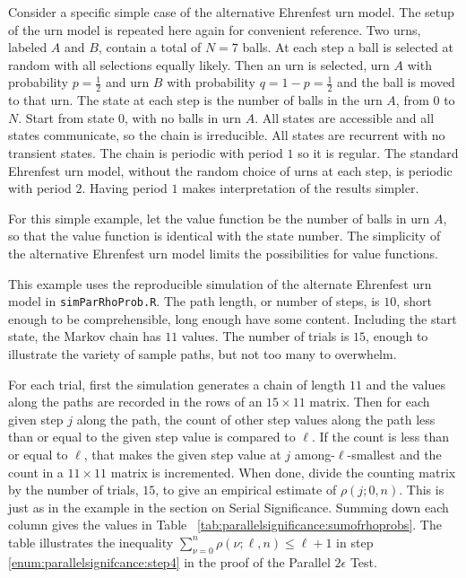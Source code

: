 \documentclass[12pt]{article}
\begin{document}
\begin{example}
    Consider a specific simple case of the alternative Ehrenfest urn
    model.%
    The setup of the urn model is repeated here again for convenient
    reference. Two urns, labeled \( A \) and \( B \), contain a total of
    \( N = 7 \) balls.  At each step a ball is selected at random with
    all selections equally likely.  Then an urn is selected, urn \( A \)
    with probability \( p = \frac{1}{2} \) and urn \( B \) with
    probability \( q = 1-p = \frac {1}{2} \) and the ball is moved to
    that urn.  The state at each step is the number of balls in the urn \(
    A \), from \( 0 \) to \( N \).  Start from state \( 0 \), with no
    balls in urn \( A \).  All states are accessible and all states
    communicate, so the chain is irreducible.  All states are recurrent
    with no transient states.  The chain is periodic with period \( 1 \)
    so it is regular.  The standard Ehrenfest urn model, without the
    random choice of urns at each step, is periodic with period \( 2 \).
    Having period \( 1 \) makes interpretation of the results simpler.

    For this simple example, let the value function be the number of
    balls in urn \( A \), so that the value function is identical with
    the state number.  The simplicity of the alternative Ehrenfest urn
    model limits the possibilities for value functions.

    This example uses the reproducible simulation of the alternate
    Ehrenfest urn model in \texttt{simParRhoProb.R}. The path length, or
    number of steps, is \( 10 \), short enough to be comprehensible,
    long enough have some content.  Including the start state, the
    Markov chain has \( 11 \) values. The number of trials is \( 15 \),
    enough to illustrate the variety of sample paths, but not too many
    to overwhelm.

    For each trial, first the simulation generates a chain of length \(
    11 \) and the values along the paths are recorded in the rows of an \(
    15 \times 11 \) matrix. Then for each given step \( j \) along the
    path, the count of other step values along the path less than or
    equal to the given step value is compared to \( \ell \).  If the
    count is less than or equal to \( \ell \), that makes the given step
    value at \( j \) among-\( \ell \)-smallest and the count in a \( 11
    \times 11 \) matrix is incremented.  When done, divide the counting
    matrix by the number of trials, \( 15 \), to give an empirical
    estimate of \( \rho(j; 0 ,n) \).  This is just as in the example in
    the section on Serial Significance.  Summing down each column gives
    the values in Table~%
    \ref{tab:parallelsignificance:sumofrhoprobs}. The table illustrates
    the inequality \( \sum_{\nu=0}^n \rho (\nu; \ell, n) \le \ell + 1 \)
    in step~%
    \ref{enum:parallelsignifcance:step4} in the proof of the Parallel \(
    2 \epsilon \) Test.


\end{example}
\end{document}
